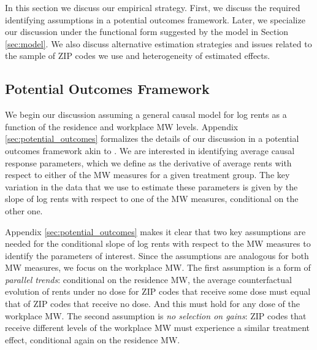 
In this section we discuss our empirical strategy.
First, we discuss the required identifying assumptions in a potential outcomes 
framework.
Later, we specialize our discussion under the functional form suggested by
the model in Section \ref{sec:model}.
We also discuss alternative estimation strategies and issues related to
the sample of ZIP codes we use and heterogeneity of estimated effects.

\subsection{Potential Outcomes Framework}

We begin our discussion assuming a general causal model for log rents as a 
function of the residence and workplace MW levels.
Appendix \ref{sec:potential_outcomes} formalizes the details of our discussion 
in a potential outcomes framework akin to \textcite{CallawayEtAl2021}.
We are interested in identifying average causal response parameters,
which we define as the derivative of average rents with respect to either
of the MW measures for a given treatment group.
The key variation in the data that we use to estimate these parameters is 
given by the slope of log rents with respect to one of the MW measures, 
conditional on the other one.

Appendix \ref{sec:potential_outcomes} makes it clear that two key assumptions 
are needed for the conditional slope of log rents with respect to the MW 
measures to identify the parameters of interest.
Since the assumptions are analogous for both MW measures, we focus on the 
workplace MW.
The first assumption is a form of \textit{parallel trends}: conditional on the 
residence MW, the average counterfactual evolution of rents under no dose for 
ZIP codes that receive some dose must equal that of ZIP codes that 
receive no dose.
And this must hold for any dose of the workplace MW.
The second assumption is \textit{no selection on gains}: ZIP codes that receive
different levels of the workplace MW must experience a similar treatment effect,
conditional again on the residence MW.

